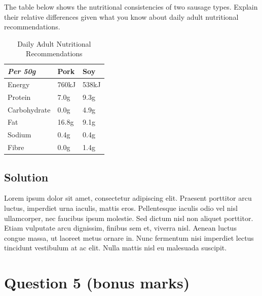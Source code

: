 \documentclass[
  UTF8, %
  12pt, %
]{assigment}
\begin{document}
\begin{problem}
The table below shows the nutritional consistencies of two sausage types. Explain their relative differences given what you know about daily adult nutritional recommendations.

\bigskip

\begin{table}[H]
  \centering
  \caption{Daily Adult Nutritional Recommendations}
  \label{tab:nutritional_recommendations}
  \begin{tabular}{|l|l|l|}
    \toprule
    \textit{Per 50g} & Pork  & Soy   \\
    \midrule
    Energy           & 760kJ & 538kJ \\
    Protein          & 7.0g  & 9.3g  \\
    Carbohydrate     & 0.0g  & 4.9g  \\
    Fat              & 16.8g & 9.1g  \\
    Sodium           & 0.4g  & 0.4g  \\
    Fibre            & 0.0g  & 1.4g  \\
    \bottomrule
  \end{tabular}
\end{table}

\medskip
\end{problem}


\subsection*{Solution}

Lorem ipsum dolor sit amet, consectetur adipiscing elit. Praesent porttitor arcu luctus, imperdiet urna iaculis, mattis eros. Pellentesque iaculis odio vel nisl ullamcorper, nec faucibus ipsum molestie. Sed dictum nisl non aliquet porttitor. Etiam vulputate arcu dignissim, finibus sem et, viverra nisl. Aenean luctus congue massa, ut laoreet metus ornare in. Nunc fermentum nisi imperdiet lectus tincidunt vestibulum at ac elit. Nulla mattis nisl eu malesuada suscipit.


\section*{Question 5 (bonus marks)}
\end{document}

